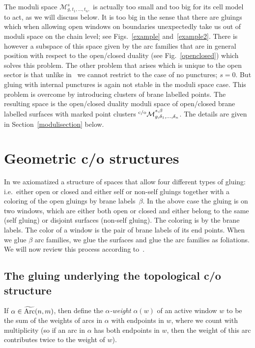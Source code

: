 \documentclass[pdftex]{sigma}
\def\M{{\mathcal M}}
\def\Mco{{{}^{\rm c/o}\mathcal M}_{g,\delta_1,\dots,\delta_n}^{s,\beta}}
\begin{document}
The moduli space  $\M_{g,t_1,\dots, t_n,}^s$  is actually too small and too big
for its cell model to act, as we will discuss below. It is too big in the sense that there are gluings
which when allowing open windows on boundaries unexpectedly take us out of moduli space on the chain level; see Figs.~\ref{example} and~\ref{example2}.
 There is however  a subspace of this space  given by the arc families
that are in general position with respect to the open/closed duality (see Fig.~\ref{openclosed}) which solves this problem.
The other problem that arises which is unique to the open sector is that unlike in~\cite{hoch1,hoch2}
we cannot restrict to the case of no punctures; $s=0$. But gluing with internal punctures is again not stable in the moduli space case. This problem is overcome by introducing clusters of brane labelled points. The resulting space is the open/closed duality moduli space of open/closed brane
labelled  surfaces with marked point clusters $\Mco$.
The details are given in Section~\ref{modulisection} below.

\section{Geometric c/o structures}
\label{geosection}

In \cite{KP} we axiomatized a structure of spaces that allow four dif\/ferent types of gluing: i.e.\
either open or closed and either self or non-self gluings together with a coloring of the open gluings by brane labels~$\beta$. In the above case the gluing is on two  windows, which are either both
open or closed and either belong to the same (self gluing) or disjoint surfaces (non-self gluing).
The coloring is by the brane labels. The color of a window is the pair of brane labels of its
end points. When we glue $\beta$ arc families, we glue the surfaces and
glue the arc families as foliations. We will now review this process according to~\cite{KP}.


\subsection{The gluing underlying the topological c/o structure}




If $\alpha\in\widetilde{\rm Arc} (n,m)$, then def\/ine the {\it $\alpha$-weight} $\alpha(w)$ of an active window $w$ to be the sum
of
the weights of arcs in $\alpha$ with endpoints in $w$, where we count with multiplicity
(so if an arc in $\alpha$ has both endpoints in $w$, then the weight of this arc contributes twice to the weight of
$w$).
\end{document}
